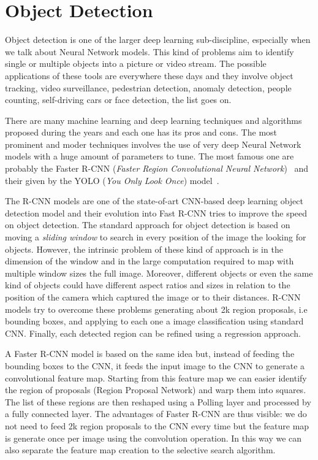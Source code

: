 \documentclass{standalone}
\begin{document}
\section[Object Detection]{Object Detection}\label{obj_detection:obj}

Object detection is one of the larger deep learning sub-discipline, especially when we talk about Neural Network models.
This kind of problems aim to identify single or multiple objects into a picture or video stream.
The possible applications of these tools are everywhere these days and they involve object tracking, video surveillance, pedestrian detection, anomaly detection, people counting, self-driving cars or face detection, the list goes on.

There are many machine learning and deep learning techniques and algorithms proposed during the years and each one has its pros and cons.
The most prominent and moder techniques involves the use of very deep Neural Network models with a huge amount of parameters to tune.
The most famous one are probably the Faster R-CNN (\emph{Faster Region Convolutional Neural Network})~\cite{ren2015faster} and their  given by the YOLO (\emph{You Only Look Once}) model~\cite{redmon2015look, redmon2016yolo9000, redmon2018yolov3}.

The R-CNN models are one of the state-of-art CNN-based deep learning object detection model and their evolution into Fast R-CNN tries to improve the speed on object detection.
The standard approach for object detection is based on moving a \emph{sliding window} to search in every position of the image the looking for objects.
However, the intrinsic problem of these kind of approach is in the dimension of the window and in the large computation required to map with multiple window sizes the full image.
Moreover, different objects or even the same kind of objects could have different aspect ratios and sizes in relation to the position of the camera which captured the image or to their distances.
R-CNN models try to overcome these problems generating about 2k region proposals, i.e bounding boxes, and applying to each one a image classification using standard CNN.
Finally, each detected region can be refined using a regression approach.

A Faster R-CNN model is based on the same idea but, instead of feeding the bounding boxes to the CNN, it feeds the input image to the CNN to generate a convolutional feature map.
Starting from this feature map we can easier identify the region of proposals (Region Proposal Network) and warp them into squares.
The list of these regions are then reshaped using a Polling layer and processed by a fully connected layer.
The advantages of Faster R-CNN are thus visible: we do not need to feed 2k region proposals to the CNN every time but the feature map is generate once per image using the convolution operation.
In this way we can also separate the feature map creation to the selective search algorithm.
\end{document}
